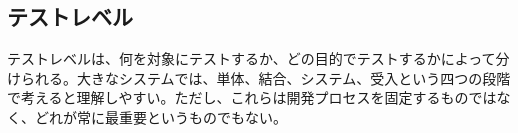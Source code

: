 \subsection{テストレベル}
テストレベルは、何を対象にテストするか、どの目的でテストするかによって分けられる。大きなシステムでは、単体、結合、システム、受入という四つの段階で考えると理解しやすい。ただし、これらは開発プロセスを固定するものではなく、どれが常に最重要というものでもない。

